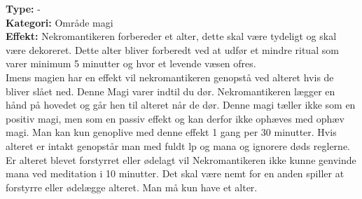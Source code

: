 \begin{død*}
\textbf{Type:} - \\
\textbf{Kategori:} Område magi\\
\textbf{Effekt:} Nekromantikeren forbereder et alter, dette skal være tydeligt og skal være dekoreret. Dette alter bliver forberedt ved at udfør et mindre ritual som varer minimum 5 minutter og hvor et levende væsen ofres.\\ 
Imens magien har en effekt vil nekromantikeren genopstå  ved alteret hvis de bliver slået ned. Denne Magi varer indtil du dør. Nekromantikeren lægger en hånd på hovedet og går hen til alteret når de dør. Denne magi tæller ikke som en positiv magi, men som en passiv effekt og kan derfor ikke ophæves med ophæv magi.  Man kan kun genoplive med denne effekt 1 gang per 30 minutter. Hvis alteret er intakt genopstår man med fuldt lp og mana og ignorere døds reglerne. Er alteret blevet forstyrret eller ødelagt vil Nekromantikeren ikke kunne genvinde mana ved meditation i 10 minutter. Det skal være nemt for en anden spiller at forstyrre eller ødelægge alteret. Man må kun have et alter.
\end{død*}